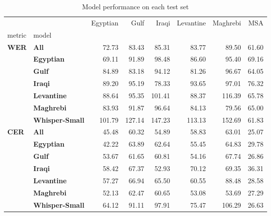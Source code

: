 \begin{table}
\caption{Model performance on each test set}
\label{tab:ex_scratch}
\begin{tabular}{llrrrrrr}
\toprule
 &  & Egyptian & Gulf & Iraqi & Levantine & Maghrebi & MSA \\
metric & model &  &  &  &  &  &  \\
\midrule
\multirow[t]{7}{*}{\textbf{WER}} & \textbf{All} & 72.73 & 83.43 & 85.31 & 83.77 & 89.50 & 61.60 \\
\textbf{} & \textbf{Egyptian} & 69.11 & 91.89 & 98.48 & 86.60 & 95.40 & 69.16 \\
\textbf{} & \textbf{Gulf} & 84.89 & 83.18 & 94.12 & 81.26 & 96.67 & 64.05 \\
\textbf{} & \textbf{Iraqi} & 89.20 & 95.19 & 78.33 & 93.65 & 97.01 & 76.32 \\
\textbf{} & \textbf{Levantine} & 88.64 & 95.35 & 101.41 & 88.37 & 116.39 & 65.78 \\
\textbf{} & \textbf{Maghrebi} & 83.93 & 91.87 & 96.64 & 84.13 & 79.56 & 65.00 \\
\textbf{} & \textbf{Whisper-Small} & 101.79 & 127.14 & 147.23 & 113.13 & 152.69 & 61.83 \\
\cline{1-8}
\multirow[t]{7}{*}{\textbf{CER}} & \textbf{All} & 45.48 & 60.32 & 54.89 & 58.83 & 63.01 & 25.07 \\
\textbf{} & \textbf{Egyptian} & 42.22 & 63.89 & 62.64 & 55.45 & 64.83 & 29.78 \\
\textbf{} & \textbf{Gulf} & 53.67 & 61.65 & 60.81 & 54.16 & 67.74 & 26.86 \\
\textbf{} & \textbf{Iraqi} & 58.42 & 67.37 & 52.93 & 70.12 & 69.35 & 36.31 \\
\textbf{} & \textbf{Levantine} & 57.27 & 66.94 & 65.50 & 60.55 & 88.48 & 28.58 \\
\textbf{} & \textbf{Maghrebi} & 52.13 & 62.47 & 60.65 & 53.08 & 53.69 & 27.29 \\
\textbf{} & \textbf{Whisper-Small} & 64.12 & 91.11 & 97.91 & 75.47 & 106.29 & 26.63 \\
\cline{1-8}
\bottomrule
\end{tabular}
\end{table}
